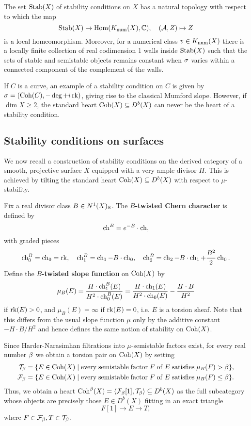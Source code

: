 \documentclass[letterpaper,11pt]{amsart}%
\theoremstyle{remark}
\begin{document}
The set $\operatorname{\mathrm{Stab}}(X)$ of stability conditions on $X$ has a natural topology with respect to which the map 
\[ \operatorname{\mathrm{Stab}}(X) \to \mathrm{Hom}(K_{\mathrm{num}}(X), \mathbb{C}), \quad (\mathcal{A}, Z) \mapsto Z \]
is a local homeomorphism. Moreover, for a numerical class $v \in K_{\mathrm{num}}(X)$ there is a locally finite collection of real codimension 1 walls inside $\operatorname{\mathrm{Stab}}(X)$ such that the sets of stable and semistable objects remains constant when $\sigma$ varies within a connected component of the complement of the walls. 

If $C$ is a curve, an example of a stability condition on $C$ is given by $\sigma = (\mathrm{Coh}(C), -\deg + i \operatorname{\mathrm{rk}})$, giving rise to the classical Mumford slope. However, if $\dim X \ge 2$, the standard heart $\mathrm{Coh}(X) \subseteq D^b(X)$ can never be the heart of a stability condition. 


\subsection{Stability conditions on surfaces}\label{section:stabcondsurf}
We now recall a construction of stability conditions on the derived category of a smooth, projective surface $X$ equipped with a very ample divisor $H$. This is achieved by tilting the standard heart $\mathrm{Coh}(X) \subseteq D^b(X)$ with respect to $\mu$-stability. 

Fix a real divisor class $B \in N^1(X)_{\mathbb{R}}$. The {\bf $B$-twisted Chern character} is defined by
\[ \operatorname{\mathrm{ch}}^B = e^{-B}\cdot \operatorname{\mathrm{ch}}, \]
with graded pieces
\[ \operatorname{\mathrm{ch}}^B_0 = \operatorname{\mathrm{ch}}_0 = \operatorname{\mathrm{rk}}, \quad \operatorname{\mathrm{ch}}^B_1 = \operatorname{\mathrm{ch}}_1 - B \cdot \operatorname{\mathrm{ch}}_0, \quad \operatorname{\mathrm{ch}}^B_2 = \operatorname{\mathrm{ch}}_2 - B \cdot \operatorname{\mathrm{ch}}_1 + \frac{B^2}{2} \operatorname{\mathrm{ch}}_0. \]
Define the {\bf $B$-twisted slope function} on $\mathrm{Coh}(X)$ by
\[ \mu_B(E) = \frac{H \cdot \operatorname{\mathrm{ch}}^B_1(E)}{H^2 \cdot \operatorname{\mathrm{ch}}^B_0(E)} = \frac{H \cdot \operatorname{\mathrm{ch}}_1(E)}{H^2 \cdot \operatorname{\mathrm{ch}}_0(E)} - \frac{H \cdot B}{H^2} \]
if $\operatorname{\mathrm{rk}}(E) > 0$, and $\mu_B(E) = \infty$ if $\operatorname{\mathrm{rk}}(E) = 0$, i.e. $E$ is a torsion sheaf. Note that this differs from the usual slope function $\mu$ only by the additive constant $-H\cdot B/H^2$ and hence defines the same notion of stability on $\mathrm{Coh}(X)$. 

Since Harder-Narasimhan filtrations into $\mu$-semistable factors exist, for every real number $\beta$ we obtain a torsion pair on $\mathrm{Coh}(X)$ by setting
\begin{align*}
    \mathcal{T}_\beta & = \{ E \in \mathrm{Coh}(X) \;|\; \mathrm{every\;semistable\;factor\;} F \mathrm{\;of\;} E \mathrm{\;satisfies\;} \mu_B(F) > \beta\}, \\
    \mathcal{F}_\beta & = \{ E \in \mathrm{Coh}(X) \;|\; \mathrm{every\;semistable\;factor\;} F \mathrm{\;of\;} E \mathrm{\;satisfies\;} \mu_B(F) \le \beta\}.
\end{align*}
Thus, we obtain a heart $\mathrm{Coh}^\beta(X) = \langle \mathcal{F}_\beta[1], \mathcal{T}_\beta \rangle \subseteq D^b(X)$ as the full subcategory whose objects are precisely those $E \in D^b(X)$ fitting in an exact triangle
\[ F[1] \to E \to T, \]
where $F \in \mathcal{F}_\beta, T \in \mathcal{T}_\beta$. 
\end{document}
